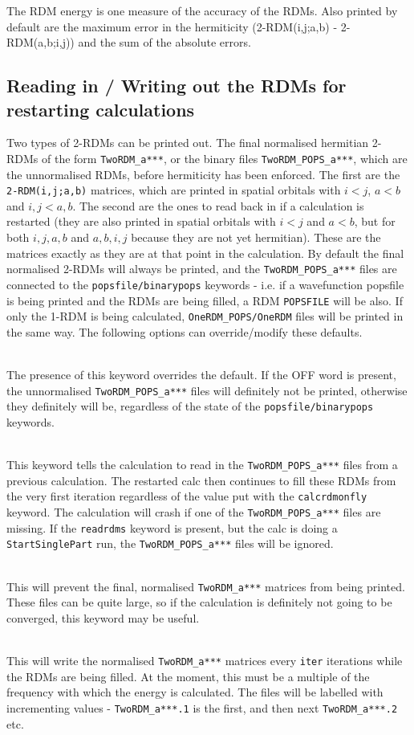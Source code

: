 \documentclass[a4paper,notitlepage]{scrreprt}
\newcommand\codeitem[1]{\needspace{1.5\baselineskip}\item[\textnormal{\ttfamily #1 \nopagebreak}] \hfill \\ \nopagebreak}
\let\code\lstinline
\begin{document}
    The RDM energy is one measure of the accuracy of the RDMs.  Also printed by default are the maximum error in the
    hermiticity (2-RDM(i,j;a,b) - 2-RDM(a,b;i,j)) and the sum of the absolute errors.

\subsection{Reading in / Writing out the RDMs for restarting calculations}

	Two types of 2-RDMs can be printed out.  The final normalised hermitian 2-RDMs of the form \code{TwoRDM_a***}, or the
	binary files \code{TwoRDM_POPS_a***}, which are the unnormalised RDMs, before hermiticity has been enforced.  The
	first are the \code{2-RDM(i,j;a,b)} matrices, which are printed in
    spatial orbitals with $i<j$, $a<b$ and $i,j<a,b$.  The second are the ones to read back in if a calculation
    is restarted (they are also printed in spatial orbitals with $i<j$ and $a<b$, but for both $i,j,a,b$ and $a,b,i,j$
    because they are not yet hermitian).  These are the matrices exactly as they are at that point in the calculation.
	By default the final normalised 2-RDMs will always be printed, and the \code{TwoRDM_POPS_a***} files are connected to the
    \code{popsfile/binarypops} keywords - i.e. if a wavefunction popsfile is being printed and the RDMs are being filled,
	a RDM \code{POPSFILE} will be also.
	If only the 1-RDM is being calculated, \code{OneRDM_POPS/OneRDM} files will be printed in the same way.
    The following options can override/modify these defaults.

	\begin{description}
		\codeitem{writerdmstoread off}
	The presence of this keyword overrides the default.  If the OFF word is present, the unnormalised \code{TwoRDM_POPS_a***}
    files will definitely not be printed, otherwise they definitely will be, regardless of the state of the
    \code{popsfile/binarypops} keywords.

\codeitem{readrdms}
	This keyword tells the calculation to read in the \code{TwoRDM_POPS_a***} files from a previous calculation.  The
    restarted calc then continues to fill these RDMs from the very first iteration regardless of the value put with
	the \code{calcrdmonfly} keyword.  The calculation will crash if one of the \code{TwoRDM_POPS_a***} files are missing.  If
	the \code{readrdms} keyword is present, but the calc is doing a \code{StartSinglePart} run, the \code{TwoRDM_POPS_a***} files
    will be ignored.

\codeitem{nonormrdms}
	This will prevent the final, normalised \code{TwoRDM_a***} matrices from being printed.  These files can be quite
    large, so if the calculation is definitely not going to be converged, this keyword may be useful.

\codeitem{writerdmsevery iter}
	This will write the normalised \code{TwoRDM_a***} matrices every \code{iter} iterations while the RDMs are being
    filled.  At the moment, this must be a multiple of the frequency with which the energy is calculated.  The
	files will be labelled with incrementing values - \code{TwoRDM_a***.1} is the first, and then next \code{TwoRDM_a***.2} etc.
\end{description}
\end{document}
